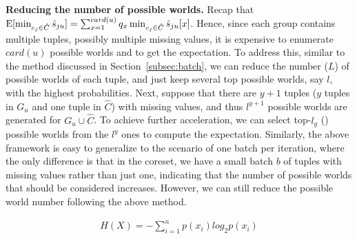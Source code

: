 \noindent \textbf{Reducing the number of possible worlds.} Recap that $\mathrm{E}[\min_{c_j\in \hat {C}}\hat{s}_{ju}] = \sum_{x=1}^{card(u)} q_x \min_{c_j \in \hat{C}} \hat{s}_{ju}[x]$.
%
Hence, since each group contains multiple tuples, possibly multiple missing values,  it is expensive to enumerate $card(u)$ possible worlds and  to get the expectation. 
To address this, similar to the method discussed in
Section~\ref{subsec:batch},  we can reduce the number ($L$) of possible worlds of each tuple, and just keep several top possible worlds, say $l$, with the highest probabilities. 
Next, suppose that there are $y+1$ tuples ($y$ tuples in $G_u$ and one tuple in $\hat{C}$) with missing values, and thus $l^{y+1}$ possible worlds are generated for $G_u \cup \hat{C}$. To achieve further acceleration, we can select top-$l_g$ () possible worlds from the $l^y$ ones to compute the expectation.
Similarly, the above framework is easy to generalize to the scenario of one batch per iteration, where the only difference is that in the coreset, we have a small batch $b$ of tuples with missing values rather than just one, indicating that the number of possible worlds that should be considered increases. However, we can still reduce the possible world number following the above method. 



  \begin{equation}\label{eqa:entropy}
    \begin{aligned}
        H(X) = -\sum_{i=1}^n p(x_i)log_2p(x_i)
    \end{aligned}
\end{equation}

 
